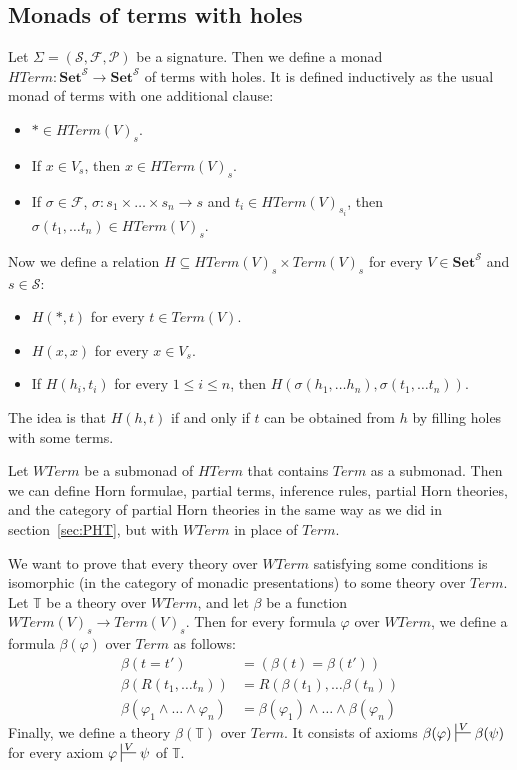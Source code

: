 \documentclass[reqno]{amsart}
\theoremstyle{definition}
\theoremstyle{remark}
\newcommand{\cat}[1]{\mathbf{#1}}
\newcommand{\Set}{\cat{Set}}
\numberwithin{figure}{section}
\begin{document}
\subsection{Monads of terms with holes}

Let $\Sigma = (\mathcal{S},\mathcal{F},\mathcal{P})$ be a signature.
Then we define a monad $HTerm : \Set^\mathcal{S} \to \Set^\mathcal{S}$ of terms with holes.
It is defined inductively as the usual monad of terms with one additional clause:
\begin{itemize}
\item $* \in HTerm(V)_s$.
\item If $x \in V_s$, then $x \in HTerm(V)_s$.
\item If $\sigma \in \mathcal{F}$, $\sigma : s_1 \times \ldots \times s_n \to s$ and $t_i \in HTerm(V)_{s_i}$, then $\sigma(t_1, \ldots t_n) \in HTerm(V)_s$.
\end{itemize}

Now we define a relation $H \subseteq HTerm(V)_s \times Term(V)_s$ for every $V \in \Set^\mathcal{S}$ and $s \in \mathcal{S}$:
\begin{itemize}
\item $H(*,t)$ for every $t \in Term(V)$.
\item $H(x,x)$ for every $x \in V_s$.
\item If $H(h_i,t_i)$ for every $1 \leq i \leq n$, then $H(\sigma(h_1, \ldots h_n), \sigma(t_1, \ldots t_n))$.
\end{itemize}
The idea is that $H(h,t)$ if and only if $t$ can be obtained from $h$ by filling holes with some terms.

Let $WTerm$ be a submonad of $HTerm$ that contains $Term$ as a submonad.
Then we can define Horn formulae, partial terms, inference rules, partial Horn theories, and the category of partial Horn theories
    in the same way as we did in section~\ref{sec:PHT}, but with $WTerm$ in place of $Term$.

We want to prove that every theory over $WTerm$ satisfying some conditions is isomorphic (in the category of monadic presentations) to some theory over $Term$.
Let $\mathbb{T}$ be a theory over $WTerm$, and let $\beta$ be a function $WTerm(V)_s \to Term(V)_s$.
Then for every formula $\varphi$ over $WTerm$, we define a formula $\beta(\varphi)$ over $Term$ as follows:
\begin{align*}
\beta(t = t') & = (\beta(t) = \beta(t')) \\
\beta(R(t_1, \ldots t_n)) & = R(\beta(t_1), \ldots \beta(t_n)) \\
\beta(\varphi_1 \land \ldots \land \varphi_n) & = \beta(\varphi_1) \land \ldots \land \beta(\varphi_n)
\end{align*}
Finally, we define a theory $\beta(\mathbb{T})$ over $Term$.
It consists of axioms $\beta(\varphi) \sststile{}{V} \beta(\psi)$ for every axiom $\varphi \sststile{}{V} \psi$ of $\mathbb{T}$.
\end{document}
